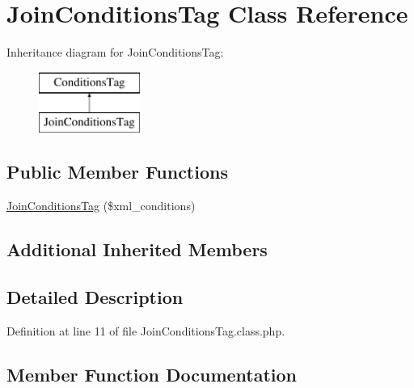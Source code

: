 \hypertarget{classJoinConditionsTag}{}\section{Join\+Conditions\+Tag Class Reference}
\label{classJoinConditionsTag}
Inheritance diagram for Join\+Conditions\+Tag\+:\begin{figure}[H]
\begin{center}
\leavevmode
\includegraphics[height=2.000000cm]{classJoinConditionsTag}
\end{center}
\end{figure}
\subsection*{Public Member Functions}
\begin{DoxyCompactItemize}
\item 
\hyperlink{classJoinConditionsTag_aa482f0c93e57933796566139e1b74f0e}{Join\+Conditions\+Tag} (\$xml\+\_\+conditions)
\end{DoxyCompactItemize}
\subsection*{Additional Inherited Members}


\subsection{Detailed Description}


Definition at line 11 of file Join\+Conditions\+Tag.\+class.\+php.



\subsection{Member Function Documentation}
\hypertarget{classJoinConditionsTag_aa482f0c93e57933796566139e1b74f0e}{}
